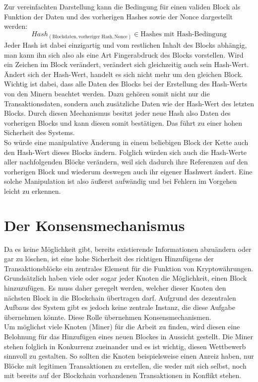 \documentclass[12pt]{article}
\begin{document}
Zur vereinfachten Darstellung kann die Bedingung für einen validen Block als Funktion der Daten und des vorherigen Hashes sowie der Nonce dargestellt werden:
\[Hash_{(\text{Blockdaten}, \text{vorheriger Hash}, \text{Nonce})}\in \text{Hashes mit Hash-Bedingung}\]
Jeder Hash ist dabei einzigartig und vom restlichen Inhalt des Blocks abhängig, man kann ihn sich also als eine Art Fingerabdruck des Blocks vorstellen. Wird ein Zeichen im Block verändert, verändert sich gleichzeitig auch sein Hash-Wert. Ändert sich der Hash-Wert, handelt es sich nicht mehr um den gleichen Block. Wichtig ist dabei, dass alle Daten des Blocks bei der Erstellung des Hash-Werts von den Minern beachtet werden. Dazu gehören somit nicht nur die Transaktionsdaten, sondern auch zusätzliche Daten wie der Hash-Wert des letzten Blocks. Durch diesen Mechanismus besitzt jeder neue Hash also Daten des vorherigen Blocks und kann diesen somit bestätigen. Das führt zu einer hohen Sicherheit des Systems.\\
So würde eine manipulative Änderung in einem beliebigen Block der Kette auch den Hash-Wert dieses Blocks ändern. Folglich würden sich auch die Hash-Werte aller nachfolgenden Blöcke verändern, weil sich dadurch ihre Referenzen auf den vorherigen Block und wiederum deswegen auch ihr eigener Hashwert ändert. Eine solche Manipulation ist also äußerst aufwändig und bei Fehlern im Vorgehen leicht zu erkennen.

\section{Der Konsensmechanismus}
Da es keine Möglichkeit gibt, bereits existierende Informationen abzuändern oder gar zu löschen, ist eine hohe Sicherheit des richtigen Hinzufügens der Transaktionsblöcke ein zentrales Element für die Funktion von Kryptowährungen. Grundsätzlich haben viele oder sogar jeder Knoten die Möglichkeit, einen Block hinzuzufügen. Es muss daher geregelt werden, welcher dieser Knoten den nächsten Block in die Blockchain übertragen darf. Aufgrund des dezentralen Aufbaus des System gibt es jedoch keine zentrale Instanz, die diese Aufgabe übernehmen könnte. Diese Rolle übernehmen Konsensmechanismen.\\
Um möglichst viele Knoten (Miner) für die Arbeit zu finden, wird diesen eine Belohnung für das Hinzufügen eines neuen Blockes in Aussicht gestellt. Die Miner stehen folglich in Konkurrenz zueinander und es ist wichtig, diesen Wettbewerb sinnvoll zu gestalten. So sollten die Knoten beispielsweise einen Anreiz haben, nur Blöcke mit legitimen Transaktionen zu erstellen, die weder mit sich selbst, noch mit bereits auf der Blockchain vorhandenen Transaktionen in Konflikt stehen.
\end{document}
